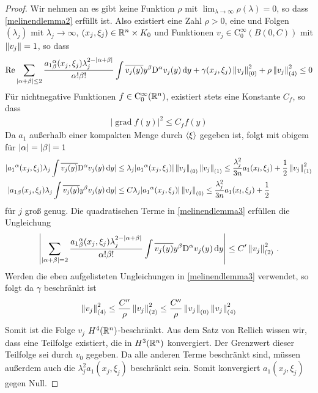 \begin{proof}
Wir nehmen an es gibt keine Funktion $\rho$ mit $\lim_{\lambda\to\infty}\rho(\lambda)=0$, so dass \eqref{melinendlemma2} erfüllt ist. Also existiert eine Zahl $\rho>0$, eine und Folgen $(\lambda_j)$ mit $\lambda_j\to\infty$, $(x_j,\xi_j)\in\mathbb R^n\times K_0$ und Funktionen $v_j\in\mathrm C^\infty_0(B(0,C))$ mit $\left\lVert v_j\right\rVert =1$, so dass
\begin{align}\label{melinendlemma3}
\operatorname{Re} \sum_{|\alpha+\beta|\le 2} \frac{{a_1}^\alpha_\beta(x_j,\xi_j)\lambda_j^{2-|\alpha+\beta|}}{\alpha!\beta!}\int\overline{v_j(y)}y^\beta\mathrm D^\alpha v_j(y)\,\mathrm d y + \gamma(x_j,\xi_j)\left\lVert v_j\right\rVert_{(0)}^2 + \rho\left\lVert v_j\right\rVert _{(4)}^2 \le 0
\end{align}
Für nichtnegative Funktionen $f\in\mathrm C^\infty_0 (\mathbb R^n)$,  existiert stets eine Konstante $C_f$, so dass
\begin{align}
|\operatorname{grad}f(y)|^2\le C_f f(y)
\end{align}
Da $a_1$ außerhalb einer kompakten Menge durch $\braket{\xi}$ gegeben ist, folgt mit obigem für $\lvert\alpha\rvert=\lvert\beta\rvert=1$
\begin{align}
|{a_1}^\alpha(x_j,\xi_j)\lambda_j\int \overline{v_j(y)}\mathrm D^\alpha v_j(y)\,\mathrm d y| &\le \lambda_j|{a_1}^\alpha(x_j,\xi_j)|\left\lVert v_j\right\rVert_{(0)}\left\lVert v_j\right\rVert_{(1)} \le \frac{\lambda_j^2}{3n}a_1(x_l,\xi_j) + \frac 1 2\left\lVert v_j\right\rVert_{(1)}^2\\
|{a_1}_\beta(x_j,\xi_j)\lambda_j\int \overline{v_j(y)}y^\beta v_j(y)\,\mathrm d y| &\le C \lambda_j|{a_1}^\alpha(x_j,\xi_j)|\left\lVert v_j\right\rVert_{(0)} \le \frac{\lambda_j^2}{3n}a_1(x_l,\xi_j) + \frac 1 2
\end{align}
für $j$ groß genug. Die quadratischen Terme in \eqref{melinendlemma3} erfüllen die Ungleichung
\begin{align}
\left\lvert\sum_{|\alpha+\beta|= 2} \frac{{a_1}^\alpha_\beta(x_j,\xi_j)\lambda_j^{2-|\alpha+\beta|}}{\alpha!\beta!}\int\overline{v_j(y)}y^\beta\mathrm D^\alpha v_j(y)\,\mathrm d y\right\rvert\le C'\left\lVert v_j\right\rVert_{(2)}^2\,.
\end{align}
Werden die eben aufgelisteten Ungleichungen in \eqref{melinendlemma3} verwendet, so folgt da $\gamma$ beschränkt ist
\begin{align}
\left\lVert v_j\right\rVert_{(4)}^2\le \frac{C''}{\rho}\left\lVert v_j\right\rVert_{(2)}^2\le \frac{C''}{\rho}\left\lVert v_j\right\rVert_{(0)}\left\lVert v_j\right\rVert_{(4)}^2
\end{align}
Somit ist die Folge $v_j$ $H^4(\mathbb R^n)$-beschränkt. Aus dem Satz von Rellich wissen wir, dass eine Teilfolge existiert, die in $H^3(\mathbb R^n)$ konvergiert. Der Grenzwert dieser Teilfolge sei durch $v_0$ gegeben. Da alle anderen Terme beschränkt sind, müssen außerdem auch die $\lambda_j^2a_1(x_j,\xi_j)$ beschränkt sein. Somit konvergiert $a_1(x_j,\xi_j)$ gegen Null. 

\end{proof}
